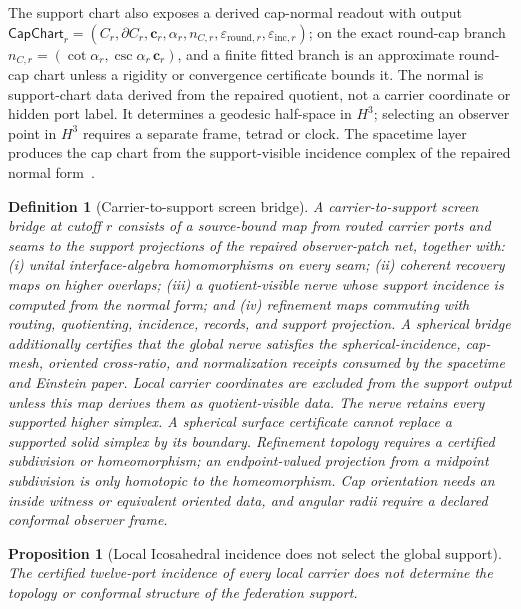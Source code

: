 \documentclass[11pt]{article}
\newtheorem{definition}[theorem]{Definition}
\newtheorem{proposition}[theorem]{Proposition}
\theoremstyle{remark}
\theoremstyle{plain}
\begin{document}
The support chart also exposes a derived cap-normal readout with output
\(\mathsf{CapChart}_r=(C_r,\partial C_r,\mathbf c_r,\alpha_r,n_{C,r},
\varepsilon_{\mathrm{round},r},\varepsilon_{\mathrm{inc},r})\); on the exact
round-cap branch \(n_{C,r}=(\cot\alpha_r,\csc\alpha_r\,\mathbf c_r)\), and a
finite fitted branch is an approximate round-cap chart unless a rigidity or
convergence certificate bounds it. The normal is support-chart data derived
from the repaired quotient, not a carrier coordinate or hidden port label. It
determines a geodesic half-space in \(H^3\); selecting an observer point in
\(H^3\) requires a separate frame, tetrad or clock. The spacetime layer
produces the cap chart from the support-visible incidence complex of the
repaired normal form~\cite{ophEinstein}.

\begin{definition}[Carrier-to-support screen bridge]\label{def:carrier-support-screen-bridge}
A carrier-to-support screen bridge at cutoff \(r\) consists of a source-bound map from routed
carrier ports and seams to the support projections of the repaired observer-patch net, together
with: (i) unital interface-algebra homomorphisms on every seam; (ii) coherent recovery maps on
higher overlaps; (iii) a quotient-visible nerve whose support incidence is computed from the
normal form; and (iv) refinement maps commuting with routing, quotienting, incidence, records,
and support projection. A spherical bridge additionally certifies that the global nerve satisfies
the spherical-incidence, cap-mesh, oriented cross-ratio, and normalization receipts consumed by
the spacetime and Einstein paper. Local carrier coordinates are excluded from the support output unless this map
derives them as quotient-visible data.
The nerve retains every supported higher simplex. A spherical surface
certificate cannot replace a supported solid simplex by its boundary.
Refinement topology requires a certified subdivision or homeomorphism; an
endpoint-valued projection from a midpoint subdivision is only homotopic to
the homeomorphism. Cap orientation needs an inside witness or equivalent
oriented data, and angular radii require a declared conformal observer frame.
\end{definition}

\begin{proposition}[Local Icosahedral incidence does not select the global support]
The certified twelve-port incidence of every local carrier does not determine the topology or
conformal structure of the federation support.
\end{proposition}
\end{document}
